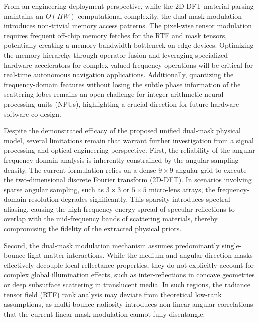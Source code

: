 From an engineering deployment perspective, while the 2D-DFT material parsing maintains an $O(HW)$ computational complexity, the dual-mask modulation introduces non-trivial memory access patterns. The pixel-wise tensor modulation requires frequent off-chip memory fetches for the RTF and mask tensors, potentially creating a memory bandwidth bottleneck on edge devices. Optimizing the memory hierarchy through operator fusion and leveraging specialized hardware accelerators for complex-valued frequency operations will be critical for real-time autonomous navigation applications. Additionally, quantizing the frequency-domain features without losing the subtle phase information of the scattering lobes remains an open challenge for integer-arithmetic neural processing units (NPUs), highlighting a crucial direction for future hardware-software co-design.

Despite the demonstrated efficacy of the proposed unified dual-mask physical model, several limitations remain that warrant further investigation from a signal processing and optical engineering perspective. First, the reliability of the angular frequency domain analysis is inherently constrained by the angular sampling density. The current formulation relies on a dense $9 \times 9$ angular grid to execute the two-dimensional discrete Fourier transform (2D-DFT). In scenarios involving sparse angular sampling, such as $3 \times 3$ or $5 \times 5$ micro-lens arrays, the frequency-domain resolution degrades significantly. This sparsity introduces spectral aliasing, causing the high-frequency energy spread of specular reflections to overlap with the mid-frequency bands of scattering materials, thereby compromising the fidelity of the extracted physical priors.

Second, the dual-mask modulation mechanism assumes predominantly single-bounce light-matter interactions. While the medium and angular direction masks effectively decouple local reflectance properties, they do not explicitly account for complex global illumination effects, such as inter-reflections in concave geometries or deep subsurface scattering in translucent media. In such regions, the radiance tensor field (RTF) rank analysis may deviate from theoretical low-rank assumptions, as multi-bounce radiosity introduces non-linear angular correlations that the current linear mask modulation cannot fully disentangle.

